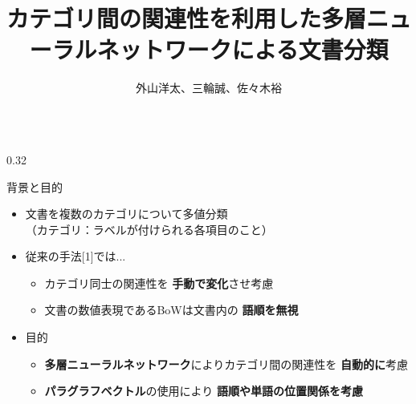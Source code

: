 \documentclass[8pt,unicode]{beamer}
\title{カテゴリ間の関連性を利用した多層ニューラルネットワークによる文書分類}
\author{外山洋太、三輪誠、佐々木裕}
\institute{豊田工業大学 工学部 先端工学基礎学科}
\date{}
\newcommand{\columnscale}{0.32}
\newcommand{\good}[1]{\textbf{\color{orange} #1}}
\newcommand{\bad}[1]{\textbf{\color{blue} #1}}
\newcommand{\keyword}[1]{\textbf{\color{red} #1}}
\begin{document}
\begin{frame}{}
\maketitle
\begin{columns}[t]

\begin{column}{\columnscale\textwidth} %
  \begin{block}{背景と目的}
    \begin{itemize}
      \item 文書を複数のカテゴリについて多値分類 \\
        （カテゴリ：ラベルが付けられる各項目のこと）
      \item 従来の手法[1]では...
        \begin{itemize}
          \item カテゴリ同士の関連性を\bad{手動で変化}させ考慮 \\
          \item 文書の数値表現であるBoWは文書内の\bad{語順を無視} \\
        \end{itemize}
      \item 目的 \\
        \begin{itemize}
          \item \keyword{多層ニューラルネットワーク}によりカテゴリ間の関連性を
            \good{自動的に}考慮 \\
          \item \keyword{パラグラフベクトル}の使用により
            \good{語順や単語の位置関係を考慮}
        \end{itemize}
    \end{itemize}
  \end{block}


\end{column}
\end{columns}
\end{frame}
\end{document}
